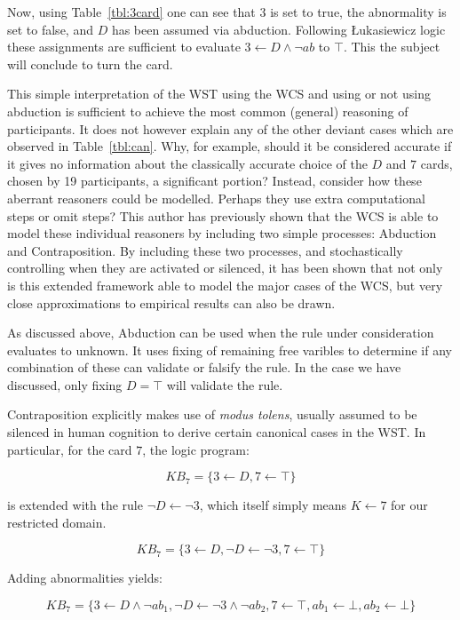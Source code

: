 \documentclass[
11pt, %
english, %
singlespacing, %
headsepline, %
]{MastersDoctoralThesis} %
\begin{document}
Now, using Table~\ref{tbl:3card} one can see that $3$ is set to true, the abnormality is set to false, and $D$ has been assumed via abduction. Following \L ukasiewicz logic these assignments are sufficient to evaluate $3\leftarrow D \land \lnot ab$ to $\top$. This the subject will conclude to turn the card.

This simple interpretation of the WST using the WCS and using or not using abduction is sufficient to achieve the most common (general) reasoning of participants. It does not however explain any of the other deviant cases which are observed in Table~\ref{tbl:can}. Why, for example, should it be considered accurate if it gives no information about the classically accurate choice of the $D$ and $7$ cards, chosen by 19 participants, a significant portion? Instead, consider how these aberrant reasoners could be modelled. Perhaps they use extra computational steps or omit steps? This author has previously shown that the WCS is able to model these individual reasoners \citep{breu2019weak} by including two simple processes: Abduction and Contraposition. By including these two processes, and stochastically controlling when they are activated or silenced, it has been shown that not only is this extended framework able to model the major cases of the WCS, but very close approximations to empirical results can also be drawn.

As discussed above, Abduction can be used when the rule under consideration evaluates to unknown. It uses fixing of remaining free varibles to determine if any combination of these can validate or falsify the rule. In the case we have discussed, only fixing $D = \top$ will validate the rule.

Contraposition explicitly makes use of \textit{modus tolens}, usually assumed to be silenced in human cognition to derive certain canonical cases in the WST. In particular, for the card $7$, the logic program:

\[
KB_7 = \{3 \leftarrow D, 7 \leftarrow \top \}
\]

is extended with the rule $\lnot D \leftarrow \lnot 3$, which itself simply means $K \leftarrow 7$ for our restricted domain. 

\[
KB_7 = \{3 \leftarrow D, \lnot D \leftarrow \lnot 3, 7 \leftarrow \top \}
\]

Adding abnormalities yields:

\[
KB_7 = \{3 \leftarrow D \land \lnot ab_1, \lnot D \leftarrow \lnot 3 \land \lnot ab_2, 7 \leftarrow \top, ab_1 \leftarrow \bot, ab_2 \leftarrow \bot \}
\]
\end{document}
